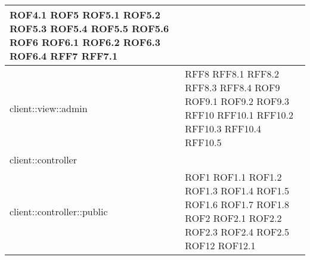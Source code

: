 \begin{center}
\begin{longtable}{| p{9cm} | p{4cm} |}
\newline ROF4.1 \newline ROF5 \newline ROF5.1 \newline ROF5.2 \newline ROF5.3 \newline ROF5.4
\newline ROF5.5  \newline ROF5.6 \newline ROF6 \newline ROF6.1 \newline ROF6.2 \newline ROF6.3 \newline ROF6.4 \newline RFF7 \newline RFF7.1 \\
\hline
client::view::admin  &  RFF8 \newline RFF8.1 \newline RFF8.2 \newline RFF8.3 \newline RFF8.4
\newline ROF9 \newline ROF9.1 \newline ROF9.2 \newline ROF9.3 \newline RFF10 \newline RFF10.1
\newline RFF10.2 \newline RFF10.3 \newline RFF10.4 \newline RFF10.5 \\
\hline
client::controller  &  \\
\hline
client::controller::public  &  ROF1 \newline ROF1.1 \newline ROF1.2 \newline ROF1.3 \newline ROF1.4
\newline ROF1.5 \newline ROF1.6 \newline ROF1.7 \newline ROF1.8 \newline ROF2 \newline ROF2.1
\newline ROF2.2 \newline ROF2.3 \newline ROF2.4 \newline ROF2.5 \newline ROF12 \newline ROF12.1

\end{longtable}
\end{center}

